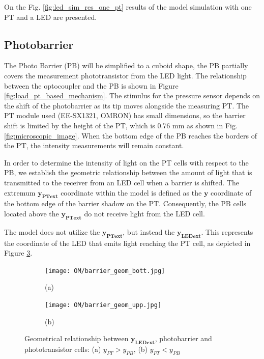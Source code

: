 On the Fig. \ref{fig:led_sim_res_one_pt} results of the model simulation with one PT and a LED are presented.

\subsection{Photobarrier}
The Photo Barrier (PB) will be simplified to a cuboid shape, the PB partially covers the measurement phototransistor from the LED light. The relationship between the optocoupler and the PB is shown in Figure \ref{fig:load_pt_based_mechanism}. 
The stimulus for the pressure sensor depends on the shift of the photobarrier 
as its tip moves alongside the measuring PT. 
The PT module used (EE-SX1321, OMRON) has small dimensions, 
so the barrier shift is limited by the height of the PT, which is 0.76 mm as shown in Fig. \ref{fig:microscopic_image}. 
When the bottom edge of the PB reaches the borders of the PT, 
the intensity measurements will remain constant.

In order to determine the intensity of light on the PT cells with respect to the PB, 
we establish the geometric relationship between the amount of light that 
is transmitted to the receiver from an LED cell when a barrier is shifted. 
The extremum $\boldsymbol{y_{\text{PT}ext}}$ coordinate within the model is defined 
as the $\boldsymbol{y}$ coordinate of the bottom edge of the barrier shadow on the PT.
Consequently, the PB cells located above the $\boldsymbol{y_{\text{PT}ext}}$ 
do not receive light from the LED cell.

The model does not utilize the $\boldsymbol{y_{\text{PT}ext}}$, but instead the $\boldsymbol{y_{\text{LED}ext}}$. 
This represents the coordinate of the LED that emits light reaching the PT cell, 
as depicted in Figure \ref{fig:extremum_ys_cell}.

\begin{figure}[H]
  \centering
  \begin{subfigure}[b]{0.5\textwidth}
    \texttt{[image: OM/barrier\_geom\_bott.jpg]}
    \centering
    \label{fig:extremum_ys_cell_bottom}
    \caption*{(a)}
  \end{subfigure}
  \begin{subfigure}[b]{0.5\textwidth}
    \texttt{[image: OM/barrier\_geom\_upp.jpg]}
    \label{fig:extremum_ys_cell_upp}
    \caption*{(b)}
  \end{subfigure}
  \caption{Geometrical relationship between $\boldsymbol{y_{\text{LED}ext}}$, photobarrier and phototransistor cells: (a) $y_{PT} > y_{PB}$, (b)  $y_{PT} < y_{PB}$ }
  \label{fig:extremum_ys_cell}

\end{figure}

